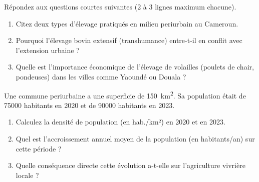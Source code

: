 \documentclass[11pt]{article}
\begin{document}
\begin{exercice}
Répondez aux questions courtes suivantes (2 à 3 lignes maximum chacune).
\begin{enumerate}
    \item Citez deux types d'élevage pratiqués en milieu periurbain au Cameroun.
    \item Pourquoi l'élevage bovin extensif (transhumance) entre-t-il en conflit avec l'extension urbaine ?
    \item Quelle est l'importance économique de l'élevage de volailles (poulets de chair, pondeuses) dans les villes comme Yaoundé ou Douala ?
\end{enumerate}
\end{exercice}

\begin{exercice}
Une commune periurbaine a une superficie de \SI{150}{km^2}. Sa population était de \num{75000} habitants en 2020 et de \num{90000} habitants en 2023.
\begin{enumerate}
    \item Calculez la densité de population (en hab./km²) en 2020 et en 2023.
    \item Quel est l'accroissement annuel moyen de la population (en habitants/an) sur cette période ?
    \item Quelle conséquence directe cette évolution a-t-elle sur l'agriculture vivrière locale ?
\end{enumerate}
\end{exercice}
\end{document}
